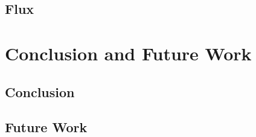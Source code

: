 \section{Flux}


\chapter{Conclusion and Future Work}
\section{Conclusion}

\section{Future Work}






